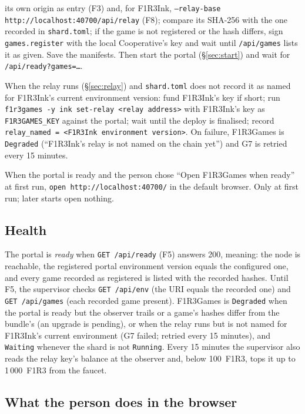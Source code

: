 \documentclass[11pt]{article}
\theoremstyle{definition}
\theoremstyle{remark}
\newcommand{\code}[1]{\texttt{#1}}
\newcommand{\Gm}{F1R3Games}
\begin{document}
\begin{description}[leftmargin=1.5em,style=nextline,itemsep=2pt]
  its own origin as entry (F3) and, for F1R3Ink, \code{--relay-base
  http://localhost:40700/api/relay} (F8); compare its SHA-256 with the one recorded in
  \code{shard.toml}; if the game is not registered or the hash differs, sign
  \code{games.register} with the local Cooperative's key and wait until
  \code{/api/games} lists it as given. Save the manifests. Then start the portal
  (\S\ref{sec:start}) and wait for \code{/api/ready?games=\ldots}.
\item[G7 name the relay] When the relay runs (\S\ref{sec:relay}) and \code{shard.toml}
  does not record it as named for F1R3Ink's current environment version: fund F1R3Ink's
  key if short; run \code{f1r3games -y ink set-relay <relay address>} with F1R3Ink's key
  as \code{F1R3GAMES\_KEY} against the portal; wait until the deploy is finalised;
  record \code{relay\_named = <F1R3Ink environment version>}. On failure, \Gm{} is
  \code{Degraded} (``F1R3Ink's relay is not named on the chain yet'') and G7 is retried
  every 15 minutes.
\item[G8 open] When the portal is ready and the person chose ``Open \Gm{} when
  ready'' at first run, \code{open http://localhost:40700/} in the default browser.
  Only at first run; later starts open nothing.
\end{description}

\subsection{Health}\label{sec:ghealth}

The portal is \emph{ready} when \code{GET /api/ready} (F5) answers 200, meaning: the
node is reachable, the registered portal environment version equals the configured
one, and every game recorded as registered is listed with the recorded hashes. Until
F5, the supervisor checks \code{GET /api/env} (the URI equals the recorded one) and
\code{GET /api/games} (each recorded game present). \Gm{} is \code{Degraded} when the
portal is ready but the observer trails or a game's hashes differ from the bundle's
(an upgrade is pending), or when the relay runs but is not named for F1R3Ink's
current environment (G7 failed; retried every 15 minutes), and \code{Waiting} whenever
the shard is not \code{Running}. Every 15 minutes the supervisor also reads the relay
key's balance at the observer and, below 100~F1R3, tops it up to 1\,000~F1R3 from the
faucet.

\subsection{What the person does in the browser}\label{sec:journey}
\end{document}
